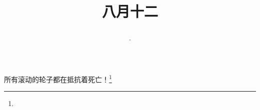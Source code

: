 \title{\date[d=14,m=9,y=2024][year:cn-y,年,month:cn,day:cn,日,·,weekday]·八月十二 }
所有滚动的轮子都在抵抗着死亡！\footnote{ }

